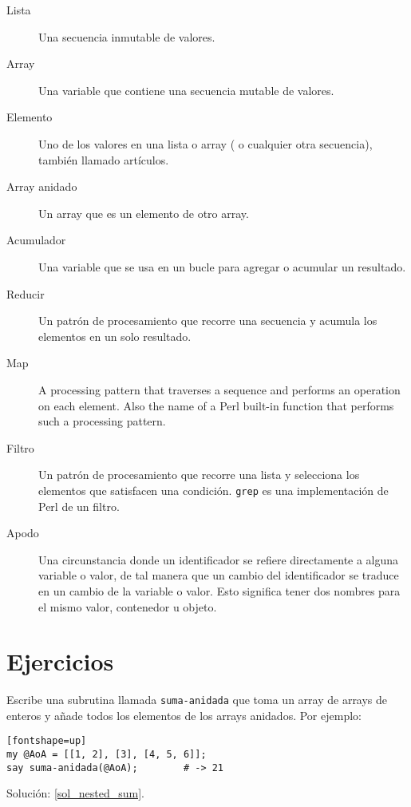 \begin{description}

\item[Lista] Una secuencia inmutable de valores.

\item[Array] Una variable que contiene una secuencia mutable
de valores.

\item[Elemento] Uno de los valores en una lista o array (
o cualquier otra secuencia), también llamado artículos.

\item[Array anidado] Un array que es un elemento de otro array.

\item[Acumulador] Una variable que se usa en un bucle 
para agregar o acumular un resultado.

\item[Reducir] Un patrón de procesamiento que recorre
una secuencia y acumula los elementos en un solo
resultado.

\item[Map] A processing pattern that traverses a 
sequence and performs an operation on each element. 
Also the name of a Perl built-in function that performs 
such a processing pattern.

\item[Filtro] Un patrón de procesamiento que recorre una
lista y selecciona los elementos que satisfacen una condición.
{\tt grep} es una implementación de Perl de un filtro.

\item[Apodo] Una circunstancia donde un identificador
se refiere directamente a alguna variable o valor, 
de tal manera que un cambio del identificador
se traduce en un cambio de la variable o valor. 
Esto significa tener dos nombres para el mismo valor,
contenedor u objeto.

\end{description}


\section{Ejercicios}
\label{array_exercises}

\begin{exercise}

Escribe una subrutina llamada \verb|suma-anidada| que toma un
array de arrays de enteros y añade todos los elementos de los
arrays anidados. Por ejemplo:
\label{nested_sum}

\begin{verbatim}[fontshape=up]
my @AoA = [[1, 2], [3], [4, 5, 6]];
say suma-anidada(@AoA);        # -> 21
\end{verbatim}

Solución: \ref{sol_nested_sum}.

\end{exercise}

